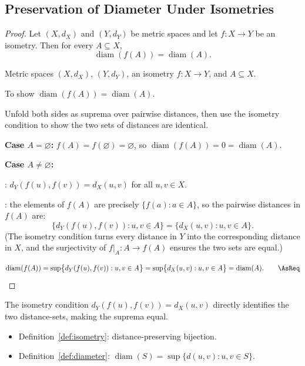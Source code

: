 
\subsection*{Preservation of Diameter Under Isometries}
\label{prf:preservation-of-diameter}

\begin{proof}
\Claim Let $(X,d_X)$ and $(Y,d_Y)$ be metric spaces and let $f : X \to Y$
be an isometry. Then for every $A \subseteq X$,
\[
\operatorname{diam}(f(A)) = \operatorname{diam}(A).
\]

\Given Metric spaces $(X,d_X)$, $(Y,d_Y)$, an isometry $f : X \to Y$, and $A \subseteq X$.

\Goal To show $\operatorname{diam}(f(A)) = \operatorname{diam}(A)$.

\Strategy Unfold both sides as suprema over pairwise distances, then use the
isometry condition to show the two sets of distances are identical.

\medskip
\noindent\textbf{Case $A = \varnothing$:} $f(A) = f(\varnothing) = \varnothing$,
so $\operatorname{diam}(f(A)) = 0 = \operatorname{diam}(A)$.

\medskip
\noindent\textbf{Case $A \neq \varnothing$:}

: $d_Y(f(u), f(v)) = d_X(u, v)$ for all $u, v \in X$.

: the elements of $f(A)$ are precisely $\{f(a) : a \in A\}$,
so the pairwise distances in $f(A)$ are:
\[
\bigl\{ d_Y(f(u), f(v)) : u, v \in A \bigr\}
= \bigl\{ d_X(u, v) : u, v \in A \bigr\}.
\]
(The isometry condition turns every distance in $Y$ into the corresponding distance in $X$,
and the surjectivity of $f|_A : A \to f(A)$ ensures the two sets are equal.)

\Therefore
\[
\operatorname{diam}(f(A))
= \sup\bigl\{ d_Y(f(u), f(v)) : u, v \in A \bigr\}
= \sup\bigl\{ d_X(u, v) : u, v \in A \bigr\}
= \operatorname{diam}(A). \qquad \AsReq
\]
\end{proof}

\begin{remark*}
The isometry condition $d_Y(f(u), f(v)) = d_X(u,v)$ directly identifies
the two distance-sets, making the suprema equal.
\end{remark*}

\begin{remark*}[Dependencies]
\begin{itemize}
  \item Definition~\ref{def:isometry}: distance-preserving bijection.
  \item Definition~\ref{def:diameter}: $\operatorname{diam}(S) = \sup\{d(u,v) : u,v \in S\}$.
\end{itemize}
\end{remark*}
